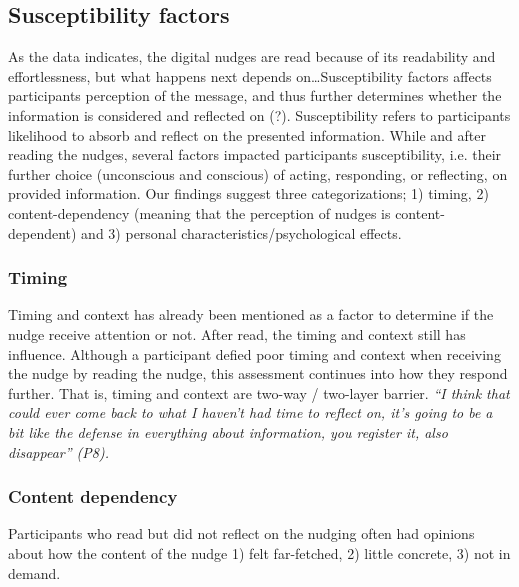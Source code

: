 \subsection{Susceptibility factors}
As the data indicates, the digital nudges are read because of its readability and effortlessness, but what happens next depends on…Susceptibility factors affects participants perception of the message, and thus further determines whether the information is considered and reflected on (?). Susceptibility refers to participants likelihood to absorb and reflect on the presented information. While and after reading the nudges, several factors impacted participants susceptibility, i.e. their further choice (unconscious and conscious) of acting, responding, or reflecting, on provided information. Our findings suggest three categorizations; 1) timing, 2) content-dependency (meaning that the perception of nudges is content-dependent) and 3) personal characteristics/psychological effects. 

\subsubsection{Timing}
Timing and context has already been mentioned as a factor to determine if the nudge receive attention or not. After read, the timing and context still has influence. Although a participant defied poor timing and context when receiving the nudge by reading the nudge, this assessment continues into how they respond further. That is, timing and context are two-way / two-layer barrier. \textit{“I think that could ever come back to what I haven't had time to reflect on, it's going to be a bit like the defense in everything about information, you register it, also disappear” (P8).}

\subsubsection{Content dependency}
Participants who read but did not reflect on the nudging often had opinions about how the content of the nudge 1) felt far-fetched, 2) little concrete, 3) not in demand.


